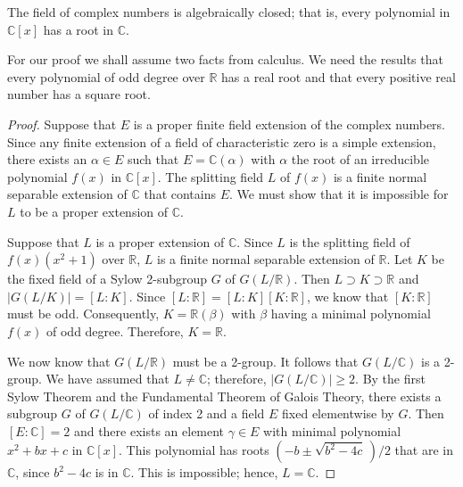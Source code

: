  
\begin{theorem}
The field of complex numbers is algebraically closed; that is, every
polynomial in ${\mathbb C}[x]$ has a root in ${\mathbb C}$. 
\end{theorem}
 
 
For our proof we shall assume two facts from calculus.  We need the
results that every polynomial of odd degree over ${\mathbb R}$ has a real
root and that every positive real number has a square root.  
 
 
\medskip
 
 
\begin{proof}
Suppose that $E$ is a proper finite field extension of the complex 
numbers. Since any finite extension of a field of characteristic zero
is a simple extension, there exists an $\alpha \in E$ such that $E =
{\mathbb C}( \alpha )$ with $\alpha$ the root of an irreducible
polynomial $f(x)$ in ${\mathbb C}[x]$. The splitting field $L$ of $f(x)$ 
is a finite normal separable extension of ${\mathbb C}$ that contains  $E$.
We must show that it is impossible for $L$ to be a proper extension of
${\mathbb C}$. 
 
 
Suppose that $L$ is a proper extension of ${\mathbb C}$. Since $L$ is the
splitting field of $f(x)(x^2 + 1)$ over ${\mathbb R}$, $L$ is a finite
normal separable extension of ${\mathbb R}$. Let $K$ be the fixed field
of a Sylow 2-subgroup $G$ of $G(L/{\mathbb R})$. Then $L \supset  K
\supset {\mathbb R}$ and $|G( L / K )| =[L:K]$. Since $[L : {\mathbb R}] =
[L:K][K:{\mathbb R}]$, we know that $[K:{\mathbb R}]$ must be odd.
Consequently, $K = {\mathbb R}(\beta)$ with $\beta$ having a minimal
polynomial $f(x)$ of odd degree.  Therefore, $K = {\mathbb R}$. 
 
 
We now know that $G(L/{\mathbb R})$ must be a 2-group. It follows that
$G(L / {\mathbb C})$ is a 2-group.  We have assumed that $L \neq {\mathbb
C}$; therefore, $|G(L / {\mathbb C})| \geq 2$.  By the first Sylow
Theorem and the Fundamental Theorem of Galois Theory, there exists a
subgroup $G$ of $G(L/{\mathbb C})$ of index 2 and a field $E$ fixed
elementwise by $G$. Then $[E:{\mathbb C}] = 2$ and there exists an
element $\gamma \in E$ with minimal polynomial $x^2 + b x + c$ in
${\mathbb C}[x]$.  This polynomial has roots $( - b \pm \sqrt{b^2 - 4
c}\, ) / 2$ that are in ${\mathbb C}$, since $b^2 - 4 c$ is in ${\mathbb
C}$.  This is impossible; hence, $L = {\mathbb C}$.
\end{proof}
 
